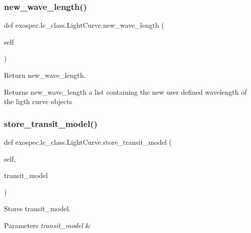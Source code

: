 \subsubsection{\texorpdfstring{new\+\_\+wave\+\_\+length()}{new\_wave\_length()}}
{\footnotesize\ttfamily def exospec.\+lc\+\_\+class.\+Light\+Curve.\+new\+\_\+wave\+\_\+length (\begin{DoxyParamCaption}\item[{}]{self }\end{DoxyParamCaption})}



Return new\+\_\+wave\+\_\+length. 

\begin{DoxyReturn}{Returns}
new\+\_\+wave\+\_\+length a list containing the new user defined wavelength of the ligth curve objects 
\end{DoxyReturn}
\mbox{\label{classexospec_1_1lc__class_1_1_light_curve_aa71fe5f0926727ae236782c414a08a4b}} 
\subsubsection{\texorpdfstring{store\+\_\+transit\+\_\+model()}{store\_transit\_model()}}
{\footnotesize\ttfamily def exospec.\+lc\+\_\+class.\+Light\+Curve.\+store\+\_\+transit\+\_\+model (\begin{DoxyParamCaption}\item[{}]{self,  }\item[{}]{transit\+\_\+model }\end{DoxyParamCaption})}



Stores transit\+\_\+model. 


\begin{DoxyParams}{Parameters}
{\em transit\+\_\+model} & \\
\hline
\end{DoxyParams}
\mbox{\label{classexospec_1_1lc__class_1_1_light_curve_a9da0e4bf8f9ea153afb534d63fb7d24a}} 
